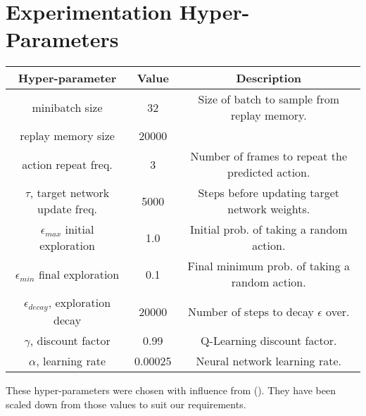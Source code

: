 \section{Experimentation Hyper-Parameters} \label{app:hparams}
\begin{center}
    \begin{tabular}{||c|c|c||}
    \hline
    Hyper-parameter  & Value & Description \\ [0.5ex]
    \hline
    \hline
    minibatch size & 32 & Size of batch to sample from replay memory. \\
    \hline
    replay memory size & 20000 & \\
    \hline
    action repeat freq. & 3 & Number of frames to repeat the predicted action. \\
    \hline
    $\tau$, target network update freq.  & 5000  & Steps before updating target network weights. \\
    \hline
    $\epsilon_{max}$ initial exploration & 1.0   & Initial prob. of taking a random action. \\
    \hline
    $\epsilon_{min}$ final exploration & 0.1 & Final minimum prob. of taking a random action. \\
    \hline
    $\epsilon_{decay}$, exploration decay & 20000 & Number of steps to decay $\epsilon$ over. \\
    \hline
    $\gamma$, discount factor & 0.99 & Q-Learning discount factor. \\
    \hline
    $\alpha$, learning rate & 0.00025 & Neural network learning rate. \\
    \hline
\end{tabular}
\end{center}

These hyper-parameters were chosen with influence from (\citet{human}). They have been scaled down from those values to suit our requirements.
